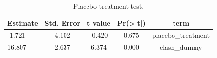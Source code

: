 \begin{table}[ht]
\centering
\caption{Placebo treatment test.}
\label{tab:robustness_placebo}
\begin{tabular}{l c c c c}
\hline
Estimate & Std. Error & t value & Pr(>|t|) & term \\
\hline
-1.721 & 4.102 & -0.420 & 0.675 & placebo\_treatment \\
16.807 & 2.637 & 6.374 & 0.000 & clash\_dummy \\
\hline
\end{tabular}
\end{table}

